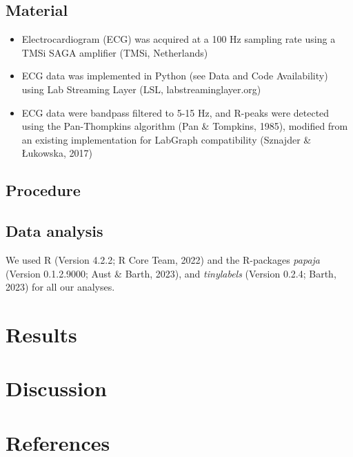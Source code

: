 \documentclass[
  man]{apa6}
\begin{document}
\hypertarget{material}{%
\subsection{Material}\label{material}}

\begin{itemize}
\item
  Electrocardiogram (ECG) was acquired at a 100 Hz sampling rate using a TMSi SAGA amplifier (TMSi, Netherlands)
\item
  ECG data was implemented in Python (see Data and Code Availability) using Lab Streaming Layer (LSL, labstreaminglayer.org)
\item
  ECG data were bandpass filtered to 5-15 Hz, and R-peaks were detected using the Pan-Thompkins algorithm (Pan \& Tompkins, 1985), modified from an existing implementation for LabGraph compatibility (Sznajder \& Łukowska, 2017)
\end{itemize}

\hypertarget{procedure}{%
\subsection{Procedure}\label{procedure}}

\hypertarget{data-analysis}{%
\subsection{Data analysis}\label{data-analysis}}

We used R (Version 4.2.2; R Core Team, 2022) and the R-packages \emph{papaja} (Version 0.1.2.9000; Aust \& Barth, 2023), and \emph{tinylabels} (Version 0.2.4; Barth, 2023) for all our analyses.

\hypertarget{results}{%
\section{Results}\label{results}}

\hypertarget{discussion}{%
\section{Discussion}\label{discussion}}

\newpage

\hypertarget{references}{%
\section{References}\label{references}}
\end{document}
